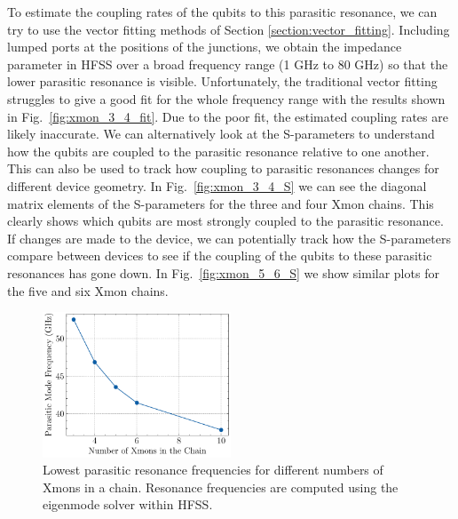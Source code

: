 To estimate the coupling rates of the qubits to this parasitic resonance, we can try to use the vector fitting methods of Section \ref{section:vector_fitting}. Including lumped ports at the positions of the junctions, we obtain the impedance parameter in HFSS over a broad frequency range (1 GHz to 80 GHz) so that the lower parasitic resonance is visible. Unfortunately, the traditional vector fitting struggles to give a good fit for the whole frequency range with the results shown in Fig.\ \ref{fig:xmon_3_4_fit}. Due to the poor fit, the estimated coupling rates are likely inaccurate. We can alternatively look at the S-parameters to understand how the qubits are coupled to the parasitic resonance relative to one another. This can also be used to track how coupling to parasitic resonances changes for different device geometry. In Fig.\ \ref{fig:xmon_3_4_S} we can see the diagonal matrix elements of the S-parameters for the three and four Xmon chains. This clearly shows which qubits are most strongly coupled to the parasitic resonance. If changes are made to the device, we can potentially track how the S-parameters compare between devices to see if the coupling of the qubits to these parasitic resonances has gone down. In Fig.\ \ref{fig:xmon_5_6_S} we show similar plots for the five and six Xmon chains.

\begin{figure}[h!]
    \centering
    \includegraphics[width=0.5\textwidth]{figures/xmon_chain_res.pdf}
    \caption{Lowest parasitic resonance frequencies for different numbers of Xmons in a chain. Resonance frequencies are computed using the eigenmode solver within HFSS.}
    \label{fig:xmon_chain_res}
\end{figure}

